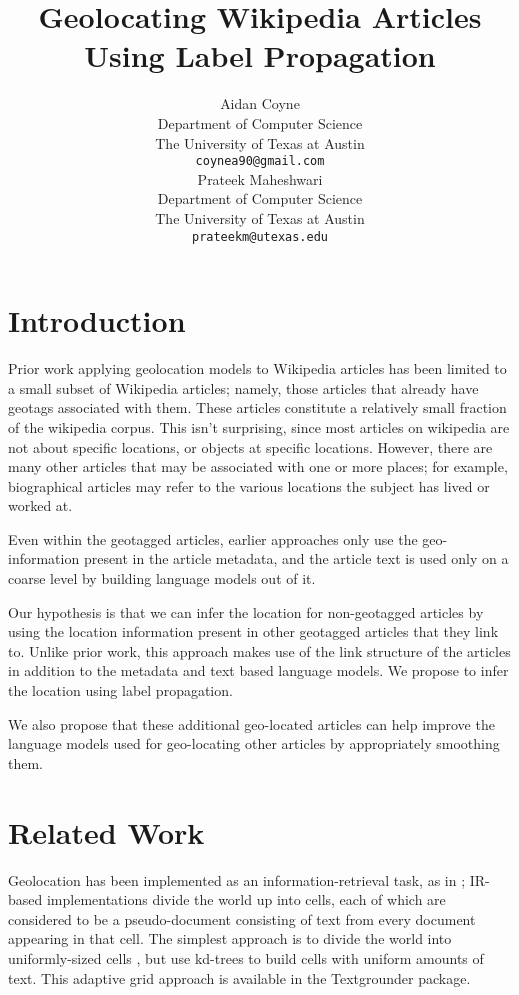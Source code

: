 \documentclass[11pt]{article}
\title{Geolocating Wikipedia Articles Using Label Propagation}
\author{Aidan Coyne \\
    Department of Computer Science\\
    The University of Texas at Austin\\
  {\tt coynea90@gmail.com} \\ 
  \And
  Prateek Maheshwari\\
     Department of Computer Science\\
    The University of Texas at Austin\\
  {\tt prateekm@utexas.edu}}
\date{}
\begin{document}
\maketitle

\section{Introduction}
Prior work applying geolocation models to Wikipedia articles 
has been limited to a small subset of Wikipedia articles; 
namely, those articles that already have geotags associated with them. 
These articles constitute a relatively small fraction %
of the wikipedia corpus. This isn't surprising, since most articles on wikipedia are not about specific locations, or objects at specific locations.
However, there are many other articles that may be associated with one or more places; 
for example, biographical articles may refer to the various locations the subject has lived or worked at.

Even within the geotagged articles, earlier approaches only use the geo-information present in the article metadata, and the article text is used only on a coarse level %
by building language models out of it.

Our hypothesis is that we can infer the location for non-geotagged articles 
by using the location information present in other geotagged articles that they link to. 
Unlike prior work, this approach makes use of the link structure of the articles in addition to the metadata and text based language models. 
We propose to infer the location using label propagation.

We also propose that these additional geo-located articles can help improve the language models used for geo-locating other articles by appropriately smoothing them.

\section{Related Work}
Geolocation has been implemented as an information-retrieval task, as in
\cite{skiles:12}; IR-based implementations divide the world up into cells, each
of which are considered to be a pseudo-document consisting of text from every
document appearing in that cell.
The simplest approach is to divide the world into uniformly-sized cells %
, but \cite{rolleretal:12} use kd-trees to build cells with uniform amounts of text.
This adaptive grid approach is available in the Textgrounder package.
\end{document}
